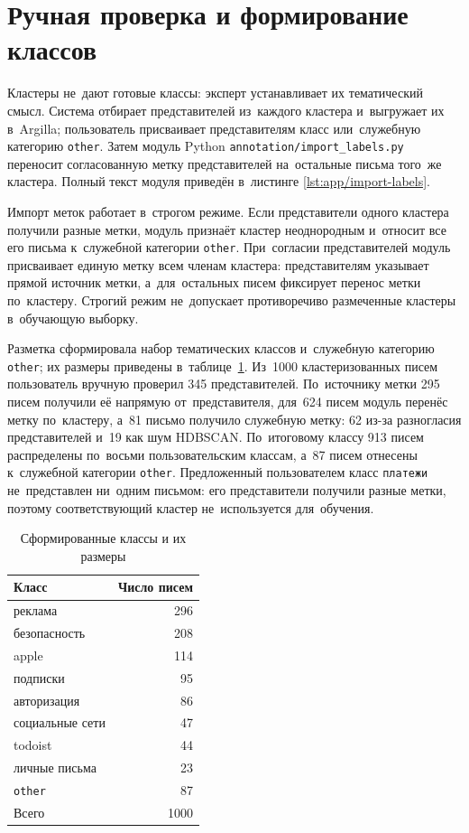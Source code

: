\section{Ручная проверка и формирование классов}\label{sec:ch3/annot}

Кластеры не~дают готовые классы: эксперт устанавливает их тематический смысл.
Система отбирает представителей из~каждого кластера и~выгружает их в~Argilla;
пользователь присваивает представителям класс или~служебную категорию
\texttt{other}. Затем модуль Python \texttt{annotation/import\_labels.py}
переносит согласованную метку представителей на~остальные письма того~же
кластера. Полный текст модуля приведён в~листинге
\ref{lst:app/import-labels}.

Импорт меток работает в~строгом режиме. Если представители одного кластера
получили разные метки, модуль признаёт кластер неоднородным и~относит все его
письма к~служебной категории \texttt{other}. При~согласии представителей модуль
присваивает единую метку всем членам кластера: представителям указывает прямой
источник метки, а~для~остальных писем фиксирует перенос метки по~кластеру.
Строгий режим не~допускает противоречиво размеченные кластеры в~обучающую
выборку.

Разметка сформировала набор тематических классов и~служебную категорию
\texttt{other}; их размеры приведены в~таблице~\ref{tab:ch3/classes}.
Из~1000 кластеризованных писем пользователь вручную проверил 345 представителей.
По~источнику метки 295 писем получили её напрямую от~представителя, для~624
писем модуль перенёс метку по~кластеру, а~81 письмо получило служебную метку:
62 из-за разногласия представителей и~19 как шум HDBSCAN. По~итоговому классу
913 писем распределены по~восьми пользовательским классам, а~87 писем отнесены
к~служебной категории \texttt{other}. Предложенный пользователем класс
\texttt{платежи} не~представлен ни~одним письмом: его представители получили
разные метки, поэтому соответствующий кластер не~используется для~обучения.

\begin{table}[htbp]
    \centering
    \caption{Сформированные классы и их размеры}\label{tab:ch3/classes}
    \begin{tabular}{@{}lr@{}}
        \toprule
        Класс & Число писем \\
        \midrule
        реклама          & 296 \\
        безопасность     & 208 \\
        apple            & 114 \\
        подписки         & 95  \\
        авторизация      & 86  \\
        социальные сети  & 47  \\
        todoist          & 44  \\
        личные письма    & 23  \\
        \texttt{other}   & 87  \\
        \midrule
        Всего            & 1000 \\
        \bottomrule
    \end{tabular}
\end{table}
\FloatBarrier

